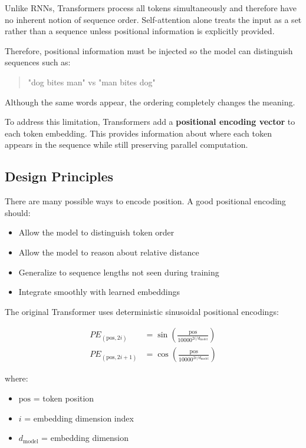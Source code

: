 \documentclass[11pt]{article}
\begin{document}
Unlike RNNs, Transformers process all tokens simultaneously and therefore have no inherent notion of sequence order. Self-attention alone treats the input as a set rather than a sequence unless positional information is explicitly provided.

Therefore, positional information must be injected so the model can distinguish sequences such as:

\begin{quote}
"dog bites man" vs "man bites dog"
\end{quote}

Although the same words appear, the ordering completely changes the meaning.

To address this limitation, Transformers add a \textbf{positional encoding vector} to each token embedding. This provides information about where each token appears in the sequence while still preserving parallel computation.

\subsection{Design Principles}

There are many possible ways to encode position. A good positional encoding should:

\begin{itemize}

\item Allow the model to distinguish token order
\item Allow the model to reason about relative distance
\item Generalize to sequence lengths not seen during training
\item Integrate smoothly with learned embeddings

\end{itemize}

The original Transformer uses deterministic sinusoidal positional encodings:

\begin{align}
PE_{(\text{pos}, 2i)}
&=
\sin
\left(
\frac{\text{pos}}{10000^{2i/d_{\text{model}}}}
\right)
\\[6pt]
PE_{(\text{pos}, 2i+1)}
&=
\cos
\left(
\frac{\text{pos}}{10000^{2i/d_{\text{model}}}}
\right)
\end{align}

where:

\begin{itemize}[nosep]

\item $\text{pos}$ = token position
\item $i$ = embedding dimension index
\item $d_{\text{model}}$ = embedding dimension

\end{itemize}
\end{document}
